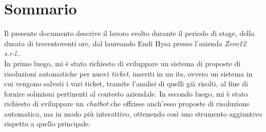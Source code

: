 \cleardoublepage
{}
{}
\begingroup
\let\clearpage\relax
\let\cleardoublepage\relax
\let\cleardoublepage\relax

\chapter*{Sommario}

Il presente documento descrive il lavoro svolto durante il periodo di stage, della durata di trecentoventi ore, dal laureando Endi Hysa presso l’azienda \textit{Zero12 s.r.l.}.\\
In primo luogo, mi è stato richiesto di sviluppare un sistema di proposte di risoluzioni automatiche per nuovi \textit{ticket}, inseriti in un \gls{its}, ovvero un sistema in cui vengono salvati i vari ticket, tramite l’analisi di quelli già risolti, al fine di fornire soluzioni pertinenti al contesto aziendale.
In secondo luogo, mi è stato richiesto di sviluppare un \textit{chatbot} che offrisse anch’esso proposte di risoluzione automatica, ma in modo più interattivo, ottenendo così uno strumento aggiuntivo rispetto a quello principale.



\endgroup

\vfill
